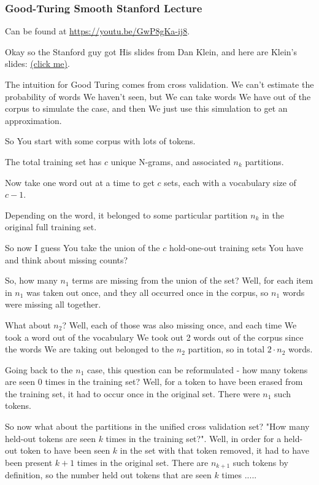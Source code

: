 \documentclass{article}
\begin{document}
		\subsubsection{Good-Turing Smooth Stanford Lecture}
		
			Can be found at \url{https://youtu.be/GwP8gKa-ij8}.
			
			Okay so the Stanford guy got His slides from Dan Klein, and here are Klein's slides: \href{https://people.eecs.berkeley.edu/~klein/cs288/sp10/slides/SP10%20cs288%20lecture%203%20--%20language%20models%20II%20(6PP).pdf}{(click me)}.
			
			The intuition for Good Turing comes from cross validation. We can't estimate the probability of words We haven't seen, but We can take words We have out of the corpus to simulate the case, and then We just use this simulation to get an approximation.
			
			So You start with some corpus with lots of tokens.
			
			The total training set has $c$ unique N-grams, and associated $n_k$ partitions. 
			
			Now take one word out at a time to get $c$ sets, each with a vocabulary size of $c-1$. 
			
			Depending on the word, it belonged to some particular partition $n_k$ in the original full training set.
			
			So now I guess You take the union of the $c$ hold-one-out training sets You have and think about missing counts?
			
			So, how many $n_1$ terms are missing from the union of the set? Well, for each item in $n_1$ was taken out once, and they all occurred once in the corpus, so $n_1$ words were missing all together.
			
			What about $n_2$? Well, each of those was also missing once, and each time We took a word out of the vocabulary We took out 2 words out of the corpus since the words We are taking out belonged to the $n_2$ partition, so in total $2\cdot n_2$ words.
			
			Going back to the $n_1$ case, this question can be reformulated - how many tokens are seen 0 times in the training set? Well, for a token to have been erased from the training set, it had to occur once in the original set. There were $n_1$ such tokens.
			
			So now what about the partitions in the unified cross validation set? "How many held-out tokens are seen $k$ times in the training set?". Well, in order for a held-out token to have been seen $k$ in the set with that token removed, it had to have been present $k+1$ times in the original set. There are $n_{k+1}$ such tokens by definition, so the number held out tokens that are seen $k$ times .....
			
\end{document}
